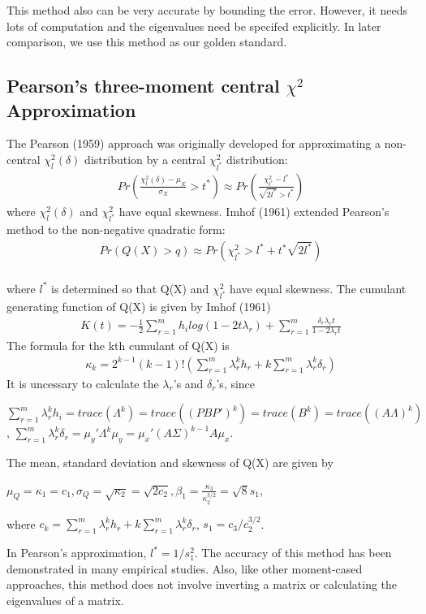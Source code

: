 \documentclass[paper=a4]{article}
\numberwithin{equation}{section}
\begin{document}
	
This method also can be very accurate by bounding the error. However, it needs lots of computation and the eigenvalues need be specifed explicitly. In later comparison, we use this method as our golden standard.

\subsection{Pearson's three-moment central $\chi^2$ Approximation}
The Pearson (1959) approach was originally developed for approximating a non-central $\chi_l^2(\delta)$ distribution by a central $\chi_{l^*}^2$ distribution:
\begin{align}
Pr(\frac{\chi_l^2(\delta)-\mu_X}{\sigma_X}> t^*) \approx Pr(\frac{\chi_{l^*}^2-l^*}{\sqrt{2l^*}>t^*})
\end{align}
where $\chi_l^2(\delta)$ and $\chi_{l^*}^2$ have equal skewness. Imhof (1961) extended Pearson's method to the non-negative quadratic form:
\begin{align}
Pr(Q(X)>q)\approx Pr(\chi_{l^*}^2 >l^*+t^*\sqrt{2l^*})
\end{align}\\
where $l^*$ is determined so that Q(X) and $\chi_{l^*}^2$ have equal skewness. 
The cumulant generating function of Q(X) is given by Imhof (1961) 
\begin{align}
K(t) = -\frac {1}{2}\sum_{r=1}^m h_ilog(1-2t\lambda_r) + \sum_{r=1}^m \frac{\delta_r\lambda_rt}{1-2\lambda_rt}
\end{align}
The formula for the kth cumulant of Q(X) is 
\begin{align}
\kappa_k=2^{k-1}(k-1)!(\sum_{r=1}^m\lambda_r^kh_r+k \sum_{r=1}^m\lambda_r^k\delta_r)
\end{align}
It is uncessary to calculate the $\lambda_r$'s and $\delta_r$'s, since
\begin{center}
	$\sum_{r=1}^m \lambda_r^kh_i=trace(\Lambda^k)=trace((PBP')^k)=trace(B^k)=trace((A\Lambda)^k)$,
	$\sum_{r=1}^m\lambda_r^k\delta_r=\mu_y'\Lambda^k\mu_y=\mu_x'(A\Sigma)^{k-1}A\mu_x$.
\end{center}
The mean, standard deviation and skewness of Q(X) are given by
\begin{center}
	$\mu_Q=\kappa_1=c_1,  \sigma_Q=\sqrt{\kappa_2}=\sqrt{2c_2}, \beta_1=\frac{\kappa_3}{\kappa_2^{3/2}}=\sqrt{8}s_1$,
\end{center}
where $ c_k=\sum_{r=1}^m\lambda_r^kh_r+k \sum_{r=1}^m\lambda_r^k\delta_r$, $s_1=c_3/c_2^{3/2}$.

In Pearson's approximation, $l^*=1/s_1^2$. The accuracy of this method has been demonstrated in many empirical studies. Also, like other moment-cased approaches, this method does not involve inverting a matrix or calculating the eigenvalues of a matrix.
\end{document}
